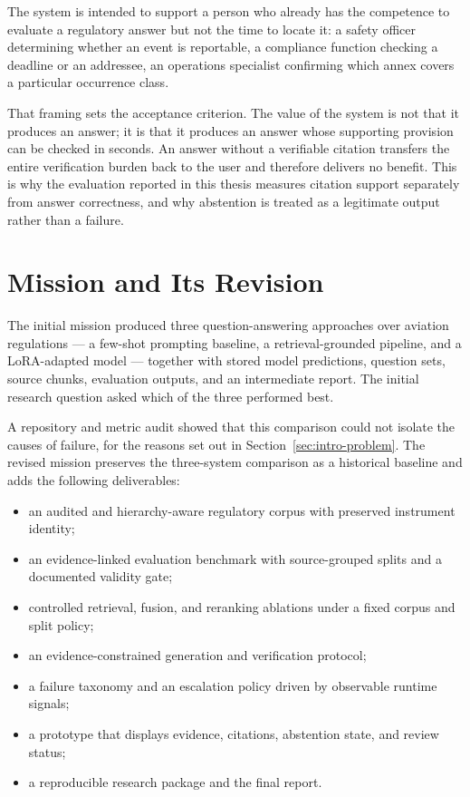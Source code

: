 The system is intended to support a person who already has the competence to evaluate a regulatory answer but not the time to locate it: a safety officer determining whether an event is reportable, a compliance function checking a deadline or an addressee, an operations specialist confirming which annex covers a particular occurrence class.

That framing sets the acceptance criterion. The value of the system is not that it produces an answer; it is that it produces an answer whose supporting provision can be checked in seconds. An answer without a verifiable citation transfers the entire verification burden back to the user and therefore delivers no benefit. This is why the evaluation reported in this thesis measures citation support separately from answer correctness, and why abstention is treated as a legitimate output rather than a failure.

\section{Mission and Its Revision}
\label{sec:context-mission}

The initial mission produced three question-answering approaches over aviation regulations --- a few-shot prompting baseline, a retrieval-grounded pipeline, and a \ac{LoRA}-adapted model --- together with stored model predictions, question sets, source chunks, evaluation outputs, and an intermediate report. The initial research question asked which of the three performed best.

A repository and metric audit showed that this comparison could not isolate the causes of failure, for the reasons set out in Section~\ref{sec:intro-problem}. The revised mission preserves the three-system comparison as a historical baseline and adds the following deliverables:

\begin{itemize}
  \item an audited and hierarchy-aware regulatory corpus with preserved instrument identity;
  \item an evidence-linked evaluation benchmark with source-grouped splits and a documented validity gate;
  \item controlled retrieval, fusion, and reranking ablations under a fixed corpus and split policy;
  \item an evidence-constrained generation and verification protocol;
  \item a failure taxonomy and an escalation policy driven by observable runtime signals;
  \item a prototype that displays evidence, citations, abstention state, and review status;
  \item a reproducible research package and the final report.
\end{itemize}

